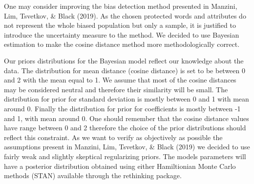 \documentclass[
  10pt,
  dvipsnames,enabledeprecatedfontcommands]{scrartcl}
\begin{document}
One may consider improving the bias detection method presented in
Manzini, Lim, Tsvetkov, \& Black (2019). As the chosen protected words
and attributes do not represent the whole biased population but only a
sample, it is justified to introduce the uncertainty measure to the
method. We decided to use Bayesian estimation to make the cosine
distance method more methodologically correct.

Our priors distributions for the Bayesian model reflect our knowledge
about the data. The distribution for mean distance (cosine distance) is
set to be between 0 and 2 with the mean equal to 1. We assume that most
of the cosine distances may be considered neutral and therefore their
similarity will be small. The distribution for prior for standard
deviation is mostly between 0 and 1 with mean around 0. Finally the
distribution for prior for coefficients is mostly between -1 and 1, with
mean around 0. One should remember that the cosine distance values have
range between 0 and 2 therefore the choice of the prior distributions
should reflect this constraint. As we want to verify as objectively as
possible the assumptions present in Manzini, Lim, Tsvetkov, \& Black
(2019) we decided to use fairly weak and slightly skeptical regularizing
priors. The models parameters will have a posterior distribution
obtained using either Hamiltionian Monte Carlo methods (STAN) available
through the rethinking package.
\end{document}
